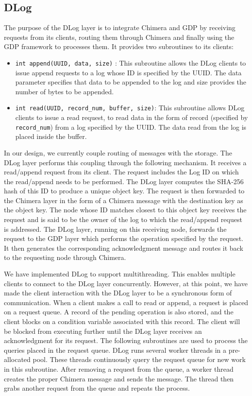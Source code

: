 \subsection{DLog}
The purpose of the DLog layer is to integrate Chimera and GDP by receiving requests from its clients, routing them through Chimera and finally using the GDP framework to processes them. It provides two subroutines to its clients:
 \begin{itemize}
\item \texttt{int append(UUID, data, size)} : This subroutine allows the DLog clients to issue append requests to  a log whose ID is specified by the UUID. The data parameter specifies that data to be appended to the log and size provides the number of bytes to be appended.
 \item \texttt{int read(UUID, record\_num, buffer,  size)}: This subroutine allows DLog clients to issue a read request, to read data in the form of record (specified by \texttt{record\_num}) from a log specified by the UUID. The data read from the log is placed inside the buffer.
 \end{itemize}
 
In our design, we currently couple routing of messages with the storage. The DLog layer performs this coupling through the following mechanism. It receives a read/append request from its client. The request includes the Log ID on which the read/append needs to be performed. The DLog layer computes the SHA-256 hash of this ID to produce a unique object key. The request is then forwarded to the Chimera layer in the form of a Chimera message with the destination key as the object key. The node whose ID matches closest to this object key receives the request and is said to be the owner of the log to which the read/append request is addressed. The DLog layer, running on this receiving node, forwards the request to the GDP layer which performs the operation specified by the request. It then generates the corresponding acknowledgment message and routes it back to the requesting node through Chimera.
 
We have implemented DLog to support multithreading. This enables multiple clients to connect to the DLog layer concurrently. However, at this point, we have made the client interaction with the DLog layer to be a synchronous form of communication. When a client makes a call to read or append, a request is placed on a request queue. A record of the pending operation is also stored, and the client blocks on a condition variable associated with this record. The client will be blocked from executing further until the DLog layer receives an acknowledgment for its request. The following subroutines are used to process the queries placed in the request queue. DLog runs several worker threads in a pre-allocated pool. These threads continuously query the request queue for new work in this subroutine. After removing a request from the queue, a worker thread creates the proper Chimera message and sends the message. The thread then grabs another request from the queue and repeats the process.
 
